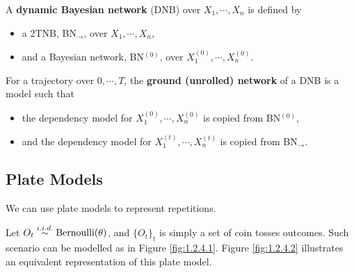 \documentclass[11pt]{article}
\begin{document}
	\begin{definition}
		A \textbf{dynamic Bayesian network} (DNB) over $X_1, \cdots, X_n$ is defined by
		\begin{itemize}
			\item a 2TNB, BN$_{\rightarrow}$, over $X_1, \cdots, X_n$,
			\item and a Bayesian network, BN$^{(0)}$, over $X_1^{(0)}, \cdots, X_n^{(0)}$.
		\end{itemize}
	\end{definition}
	
	\begin{definition}
		For a trajectory over $0, \cdots, T$, the \textbf{ground (unrolled) network} of a DNB is a model such that
		\begin{itemize}
			\item the dependency model for $X_1^{(0)}, \cdots, X_n^{(0)}$ is copied from BN$^{(0)}$,
			\item and the dependency model for $X_1^{(t)}, \cdots, X_n^{(t)}$ is copied from BN$_{\rightarrow}$.
		\end{itemize}
	\end{definition}
	
	\subsection{Plate Models}
	\par We can use plate models to represent repetitions.
	\begin{example}
		Let $O_t \overset{i.i.d.}{\sim} \text{{Bernoulli}}(\theta)$, and $\{O_t\}_t$ is simply a set of coin tosses outcomes. Such scenario can be modelled as in Figure \ref{fig:1.2.4.1}. Figure \ref{fig:1.2.4.2} illustrates an equivalent representation of this plate model.
	\end{example}
\end{document}
